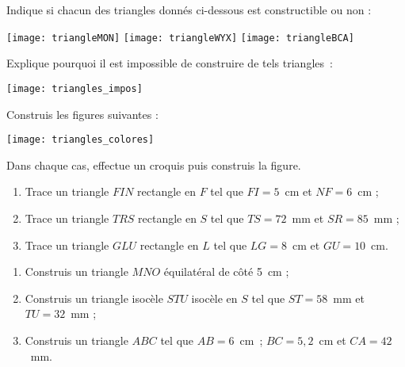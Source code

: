 

\begin{exercice}
Indique si chacun des triangles donnés ci-dessous est constructible ou non :

\texttt{[image: triangleMON]} \hfill \texttt{[image: triangleWYX]} \hfill \texttt{[image: triangleBCA]}
\end{exercice}


\begin{exercice}
Explique pourquoi il est impossible de construire de tels triangles :

\hfill \texttt{[image: triangles\_impos]} \hfill 
\end{exercice}


\begin{exercice}
Construis les figures suivantes :

\hfill \texttt{[image: triangles\_colores]} \hfill 
\end{exercice}


\begin{exercice}
Dans chaque cas, effectue un croquis puis construis la figure.

 \begin{enumerate}
  \item Trace un triangle $FIN$ rectangle en $F$ tel que $FI = 5$ cm et $NF = 6$ cm ;
  \item Trace un triangle $TRS$ rectangle en $S$ tel que $TS = 72$ mm et $SR = 85$ mm ;
  \item Trace un triangle $GLU$ rectangle en $L$ tel que $LG = 8$ cm et $GU = 10$ cm.
  \end{enumerate}
\end{exercice}


\begin{exercice}
 \begin{enumerate}
  \item Construis un triangle $MNO$ équilatéral de côté 5 cm ;
  \item Construis un triangle isocèle $STU$ isocèle en $S$ tel que $ST = 58$ mm et $TU = 32$ mm ;
  \item Construis un triangle $ABC$ tel que $AB = 6$ cm ; $BC = 5,2$ cm et $CA = 42$ mm.
  \end{enumerate}
\end{exercice}


